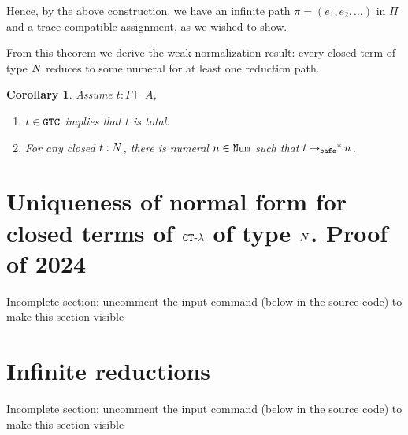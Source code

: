 \documentclass{article}
\newtheorem{corollary}[theorem]{Corollary}
\newenvironment{proof}[1][Proof]{\begin{trivlist}
\item[\hskip \labelsep {\bfseries #1}]}{\end{trivlist}}
\begin{document}
\begin{proof}
\begin{enumerate}
\end{enumerate}

  Hence, by the above construction, we have an infinite path $\pi = (e_1,e_2,\ldots)$ in $\Pi$
 and a trace-compatible assignment, as we wished to show.

  
\end{proof}

From this theorem we derive the weak normalization result: 
every closed term of type ${N}$ reduces to some numeral for at least
one reduction path. 

\begin{corollary}
Assume  $t: \Gamma\vdash A$,
\begin {enumerate}
\item
 $t \in {\tt GTC}$ implies that $t$ is total.
\item
  For any closed $t:{N}$, there is numeral $n\in{\tt Num}$ such that $t\mathbin{\mathbin{\mapsto}_{\hbox{\scriptsize \tt safe}}}^* n$. 
\end{enumerate}
\end{corollary}




\section{Uniqueness of normal form for closed terms of ${ {\tt CT}\mbox{-}\lambda}$ of type ${N}$. Proof of 2024}
\label{section-uniqueness-normal-form}
{Incomplete section: uncomment the input command (below in the source code) to make this section visible}



\section{Infinite reductions}
\label{section-infinite-reductions}
{Incomplete section: uncomment the input command (below in the source code) to make this section visible}

\end{document}
